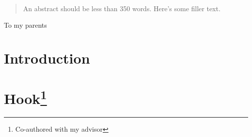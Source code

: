 \documentclass[11pt]{gsasthesis} %
\author{Econ Gradstudent} %
\begin{document}


\thesistitlepage
\copyrightpage
\begin{abstract}
  An abstract should be less than 350 words. Here's some filler text. \blindtext
\end{abstract}

\renewcommand{\contentsname}{\protect\centering\protect\Large Contents}
\renewcommand{\listtablename}{\protect\centering\protect\Large List of Tables}
\renewcommand{\listfigurename}{\protect\centering\protect\Large List of Figures}

\tableofcontents %

\listoftables
\listoffigures
\begin{acknowledgments}
  \blindtext
\end{acknowledgments}
\begin{dedication}
  To my parents
\end{dedication}



\chapter*{Introduction}\label{ch:intro}



\chapter{Hook\footnote{Co-authored with my advisor}}\label{ch:1}

\end{document}
